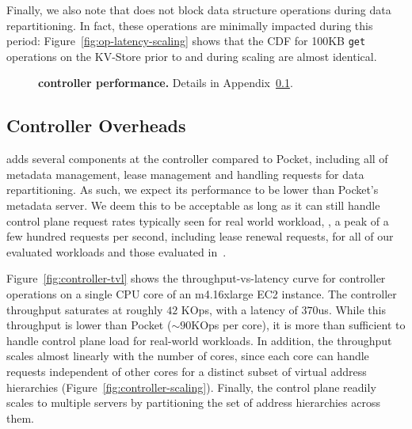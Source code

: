 Finally, we also note that \jiffy does not block data structure operations during data repartitioning. In fact, these operations are minimally impacted during this period: Figure~\ref{fig:op-latency-scaling} shows that the CDF for 100KB \texttt{get} operations on the KV-Store prior to and during scaling are almost identical.

\begin{figure}[h]
  \centering
  \caption[\jiffy controller performance]{{\textbf{\jiffy controller performance.} Details in Appendix~\ref{ssec:controller-scale}.}}
  \label{fig:controller-perf}
\end{figure}

\subsection{Controller Overheads}
\label{ssec:controller-scale}

\jiffy adds several components at the controller compared to Pocket, including all of metadata management, lease management and handling requests for data repartitioning. As such, we expect its performance to be lower than Pocket's metadata server. We deem this to be acceptable as long as it can still handle control plane request rates typically seen for real world workload, \eg, a peak of a few hundred requests per second, including lease renewal requests, for all of our evaluated workloads and those evaluated in~\cite{pocket}.

Figure~\ref{fig:controller-tvl} shows the throughput-vs-latency curve for \jiffy controller operations on a single CPU core of an m4.16xlarge EC2 instance. The controller throughput saturates at roughly $42$ KOps, with a latency of $370$us. While this throughput is lower than Pocket ($\sim 90$KOps per core), it is more than sufficient to handle control plane load for real-world workloads. In addition, the throughput scales almost linearly with the number of cores, since each core can handle requests independent of other cores for a distinct subset of virtual address hierarchies (Figure~\ref{fig:controller-scaling}). Finally, the control plane readily scales to multiple servers by partitioning the set of address hierarchies across them.

